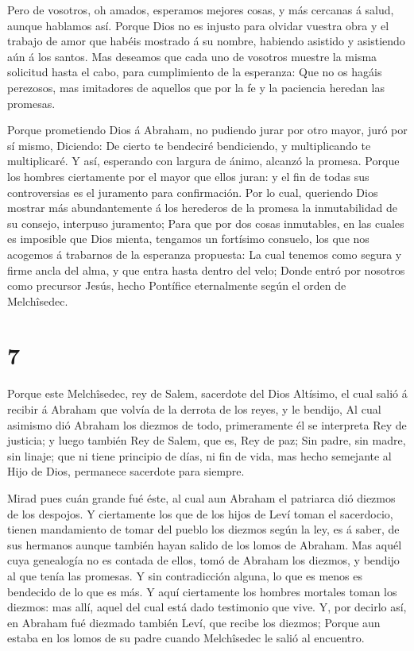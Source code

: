  Pero de vosotros, oh amados, esperamos mejores cosas, y más
cercanas á salud, aunque hablamos así.  Porque Dios no es
injusto para olvidar vuestra obra y el trabajo de amor que habéis
mostrado á su nombre, habiendo asistido y asistiendo aún á los santos.
 Mas deseamos que cada uno de vosotros muestre la misma
solicitud hasta el cabo, para cumplimiento de la esperanza:
 Que no os hagáis perezosos, mas imitadores de aquellos que
por la fe y la paciencia heredan las promesas.

 Porque prometiendo Dios á Abraham, no pudiendo jurar por
otro mayor, juró por sí mismo,  Diciendo: De cierto te
bendeciré bendiciendo, y multiplicando te multiplicaré.  Y
así, esperando con largura de ánimo, alcanzó la promesa. 
Porque los hombres ciertamente por el mayor que ellos juran: y el fin de
todas sus controversias es el juramento para confirmación. 
Por lo cual, queriendo Dios mostrar más abundantemente á los herederos
de la promesa la inmutabilidad de su consejo, interpuso juramento;
 Para que por dos cosas inmutables, en las cuales es
imposible que Dios mienta, tengamos un fortísimo consuelo, los que nos
acogemos á trabarnos de la esperanza propuesta:  La cual
tenemos como segura y firme ancla del alma, y que entra hasta dentro del
velo;  Donde entró por nosotros como precursor Jesús, hecho
Pontífice eternalmente según el orden de Melchîsedec.

\hypertarget{section-6}{%
\section{7}\label{section-6}}

 Porque este Melchîsedec, rey de Salem, sacerdote del Dios
Altísimo, el cual salió á recibir á Abraham que volvía de la derrota de
los reyes, y le bendijo,  Al cual asimismo dió Abraham los
diezmos de todo, primeramente él se interpreta Rey de justicia; y luego
también Rey de Salem, que es, Rey de paz;  Sin padre, sin
madre, sin linaje; que ni tiene principio de días, ni fin de vida, mas
hecho semejante al Hijo de Dios, permanece sacerdote para siempre.

 Mirad pues cuán grande fué éste, al cual aun Abraham el
patriarca dió diezmos de los despojos.  Y ciertamente los
que de los hijos de Leví toman el sacerdocio, tienen mandamiento de
tomar del pueblo los diezmos según la ley, es á saber, de sus hermanos
aunque también hayan salido de los lomos de Abraham.  Mas
aquél cuya genealogía no es contada de ellos, tomó de Abraham los
diezmos, y bendijo al que tenía las promesas.  Y sin
contradicción alguna, lo que es menos es bendecido de lo que es más.
 Y aquí ciertamente los hombres mortales toman los diezmos:
mas allí, aquel del cual está dado testimonio que vive.  Y,
por decirlo así, en Abraham fué diezmado también Leví, que recibe los
diezmos;  Porque aun estaba en los lomos de su padre cuando
Melchîsedec le salió al encuentro.

